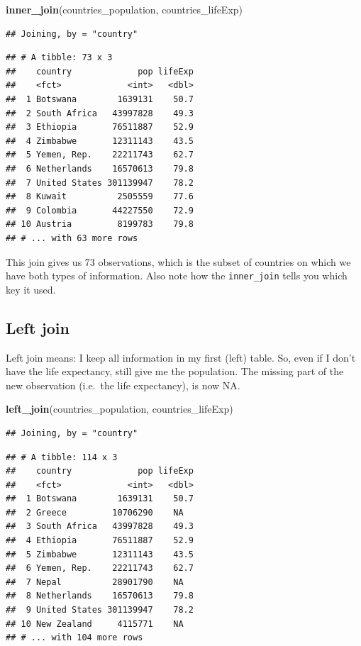 \documentclass[]{tufte-book}
\newenvironment{Shaded}{}{}
\newcommand{\KeywordTok}[1]{\textcolor[rgb]{0.00,0.44,0.13}{\textbf{#1}}}
\newcommand{\NormalTok}[1]{#1}
\begin{document}
\begin{Shaded}
\begin{Highlighting}[]
\KeywordTok{inner_join}\NormalTok{(countries_population, countries_lifeExp)}
\end{Highlighting}
\end{Shaded}

\begin{verbatim}
## Joining, by = "country"
\end{verbatim}

\begin{verbatim}
## # A tibble: 73 x 3
##    country             pop lifeExp
##    <fct>             <int>   <dbl>
##  1 Botswana        1639131    50.7
##  2 South Africa   43997828    49.3
##  3 Ethiopia       76511887    52.9
##  4 Zimbabwe       12311143    43.5
##  5 Yemen, Rep.    22211743    62.7
##  6 Netherlands    16570613    79.8
##  7 United States 301139947    78.2
##  8 Kuwait          2505559    77.6
##  9 Colombia       44227550    72.9
## 10 Austria         8199783    79.8
## # ... with 63 more rows
\end{verbatim}

This join gives us 73 observations, which is the subset of countries on which we have both types of information. Also note how the \texttt{inner\_join} tells you which key it used.

\hypertarget{left-join}{%
\subsection{Left join}\label{left-join}}

Left join means: I keep all information in my first (left) table. So, even if I don't have the life expectancy, still give me the population. The missing part of the new observation (i.e.~the life expectancy), is now NA.

\begin{Shaded}
\begin{Highlighting}[]
\KeywordTok{left_join}\NormalTok{(countries_population, countries_lifeExp)}
\end{Highlighting}
\end{Shaded}

\begin{verbatim}
## Joining, by = "country"
\end{verbatim}

\begin{verbatim}
## # A tibble: 114 x 3
##    country             pop lifeExp
##    <fct>             <int>   <dbl>
##  1 Botswana        1639131    50.7
##  2 Greece         10706290    NA  
##  3 South Africa   43997828    49.3
##  4 Ethiopia       76511887    52.9
##  5 Zimbabwe       12311143    43.5
##  6 Yemen, Rep.    22211743    62.7
##  7 Nepal          28901790    NA  
##  8 Netherlands    16570613    79.8
##  9 United States 301139947    78.2
## 10 New Zealand     4115771    NA  
## # ... with 104 more rows
\end{verbatim}
\end{document}
